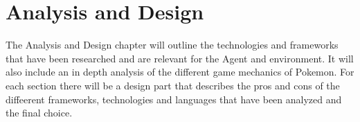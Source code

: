 \chapter{Analysis and Design}
\label{chap:analysis-and-design}

The Analysis and Design chapter will outline the technologies and frameworks that have been researched and 
are relevant for the Agent and environment. It will also include an in depth analysis
of the different game mechanics of Pokemon. For each section there will be a design part that describes the 
pros and cons of the diffeerent frameworks, technologies and languages that have been analyzed and the final choice.








